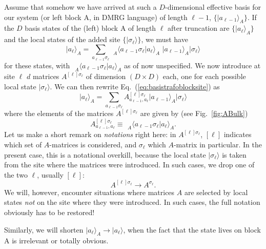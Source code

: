 \documentclass[a4paper,10pt,oneside,onecolumn,1p,times]{elsarticle}
\newcommand{\ket}[1]{\mbox{$| #1  \rangle$}}
\newcommand{\braket}[2]{\mbox{$\langle #1  | #2 \rangle$}} 	%
\begin{document}
Assume that somehow we have arrived at such a $D$-dimensional effective basis for our system (or left block A, in DMRG language) of length $\ell-1$, $\{ \ket{a_{\ell-1}}_A \}$. If the $D$ basis states of the (left) block A of length $\ell$ after truncation are $\{ \ket{a_{\ell}}_A \}$ and the local states of the added site  $\{ \ket{\sigma_\ell} \}$, we must have
\begin{equation}
\ket{a_\ell}_A = \sum_{a_{\ell-1}\sigma_\ell} \phantom\langle _A \braket{a_{\ell-1}\sigma_\ell}{a_\ell}_A \,\, \ket{a_{\ell-1}}_A\ket{\sigma_\ell}
\label{eq:basistrafoblocksite}
\end{equation}
for these states, with $\phantom\langle _A \braket{a_{\ell-1}\sigma_\ell}{a_\ell}_A$ as of now unspecified. We now introduce at site $\ell$ $d$ matrices $A^{[\ell]\sigma_\ell}$  of dimension $(D \times D)$ each, one for each possible local state $\ket{\sigma_\ell}$. We can then rewrite Eq.~(\ref{eq:basistrafoblocksite}) as
\begin{equation}
\ket{a_\ell}_A = \sum_{a_{\ell-1}\sigma_\ell} A^{[\ell]\sigma_\ell}_{a_{\ell-1}, a_\ell} \ket{a_{\ell-1}}_A  \ket{\sigma_\ell} 
\label{eq:matrixbyRG}
\end{equation}
where the elements of the matrices $A^{[\ell]\sigma_\ell}$ are given by (see Fig.~\ref{fig:ABulk})
\begin{equation}
A^{[\ell]\sigma_\ell}_{a_{\ell-1}, a_\ell} \equiv \phantom\langle_A \braket{a_{\ell-1}\sigma_\ell}{a_\ell}_A. 
\label{eq:Amatrixelements}
\end{equation}
Let us make a short remark on {\em notations} right here: in $A^{[\ell]\sigma_\ell}$, $[\ell]$ indicates which  set of $A$-matrices is considered, and $\sigma_\ell$ which $A$-matrix in particular. In the present case, this is a notational overkill, because the local state $\ket{\sigma_\ell}$ is taken from the site where the matrices were introduced. In such cases, we drop one of the two $\ell$, usually $[\ell]$:
\begin{equation}
A^{[\ell]\sigma_\ell} \rightarrow A^{\sigma_\ell} .
\end{equation}
We will, however, encounter situations where matrices $A$ are selected by local states {\em not} on the site where they were introduced. In such cases, the full notation obviously has to be restored! 

Similarly, we will shorten $\ket{a_\ell}_A \rightarrow \ket{a_\ell}$, when the fact that the state lives on block A is irrelevant or totally obvious. 
\end{document}
